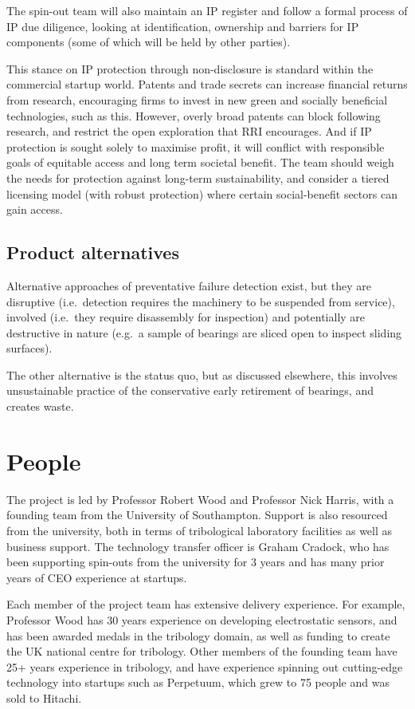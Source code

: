 \documentclass[runningheads]{llncs}
\begin{document}
    The spin-out team will also maintain an IP register and follow a formal process of IP due diligence, looking at identification, ownership and barriers for IP components (some of which will be held by other parties).

    This stance on IP protection through non-disclosure is standard within the commercial startup world. Patents and trade secrets can increase financial returns from research, encouraging firms to invest in new green and socially beneficial technologies, such as this. However, overly broad patents can block following research, and restrict the open exploration that RRI encourages. And if IP protection is sought solely to maximise profit, it will conflict with responsible goals of equitable access and long term societal benefit. The team should weigh the needs for protection against long-term sustainability, and consider a tiered licensing model (with robust protection) where certain social-benefit sectors can gain access.
\subsection{Product alternatives}
    Alternative approaches of preventative failure detection exist, but they are disruptive (i.e.\ detection requires the machinery to be suspended from service), involved (i.e.\ they require disassembly for inspection) and potentially are destructive in nature (e.g.\ a sample of bearings are sliced open to inspect sliding surfaces). 

    The other alternative is the status quo, but as discussed elsewhere, this involves unsustainable practice of the conservative early retirement of bearings, and creates waste.
\section{People}
    The project is led by Professor Robert Wood and Professor Nick Harris, with a founding team from the University of Southampton. Support is also resourced from the university, both in terms of tribological laboratory facilities as well as business support. The technology transfer officer is Graham Cradock, who has been supporting spin-outs from the university for 3 years and has many prior years of CEO experience at startups.

    Each member of the project team has extensive delivery experience. For example, Professor Wood has 30 years experience on developing electrostatic sensors, and has been awarded medals in the tribology domain, as well as funding to create the UK national centre for tribology. Other members of the founding team have 25+ years experience in tribology, and have experience spinning out cutting-edge technology into startups such as Perpetuum, which grew to 75 people and was sold to Hitachi. 
\end{document}
